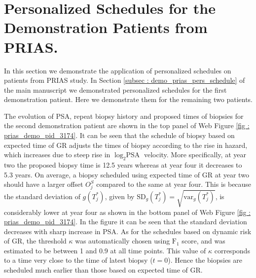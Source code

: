 
\section{Personalized Schedules for the Demonstration Patients from PRIAS.}
\label{sec : demo_3174_2340}

In this section we demonstrate the application of personalized schedules on patients from PRIAS study. In Section \ref{subsec : demo_prias_pers_schedule} of the main manuscript we demonstrated personalized schedules for the first demonstration patient. Here we demonstrate them for the remaining two patients.

The evolution of PSA, repeat biopsy history and proposed times of biopsies for the second demonstration patient are shown in the top panel of Web Figure \ref{fig : prias_demo_pid_3174}. It can be seen that the schedule of biopsy based on expected time of GR adjusts the times of biopsy according to the rise in hazard, which increases due to steep rise in $\log_2 \mbox{PSA}$ velocity. More specifically, at year two the proposed biopsy time is 12.5 years whereas at year four it decreases to 5.3 years. On average, a biopsy scheduled using expected time of GR at year two should have a larger offset $O^S_j$ compared to the same at year four. This is because the standard deviation of $g(T^*_j)$, given by $\mbox{SD}_g(T^*_j) = \sqrt{\mbox{var}_g(T^*_j)}$, is considerably lower at year four as shown in the bottom panel of Web Figure \ref{fig : prias_demo_pid_3174}. In the figure it can be seen that the standard deviation decreases with sharp increase in PSA. As for the schedules based on dynamic risk of GR, the threshold $\kappa$ was automatically chosen using $\mbox{F}_1$ score, and was estimated to be between 1 and 0.9 at all time points. This value of $\kappa$ corresponds to a time very close to the time of latest biopsy ($t=0$). Hence the biopsies are scheduled much earlier than those based on expected time of GR.

